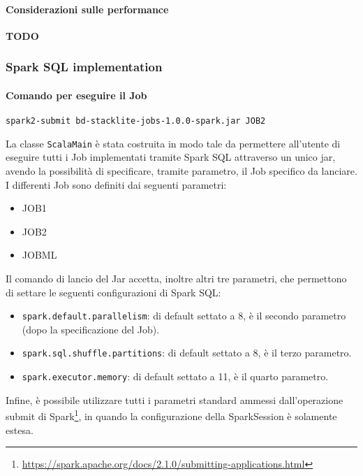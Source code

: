   \paragraph{Considerazioni sulle performance}\label{par:job2:mapreduce:performance}

  \textbf{TODO}

  \subsubsection{Spark SQL implementation}\label{subsub:job2:spark}

  \paragraph{Comando per eseguire il Job}\label{par:job2:spark:cmd}

  \texttt{spark2-submit bd-stacklite-jobs-1.0.0-spark.jar JOB2}

  La classe \texttt{ScalaMain} è stata costruita in modo tale da permettere all'utente di eseguire tutti i Job implementati tramite
  Spark SQL attraverso un unico jar, avendo la possibilità di specificare, tramite parametro, il Job specifico da lanciare.
  I differenti Job sono definiti dai seguenti parametri:
  \begin{itemize}
    \item JOB1
    \item JOB2
    \item JOBML
  \end{itemize}

  Il comando di lancio del Jar accetta, inoltre altri tre parametri, che permettono di settare le seguenti configurazioni di Spark SQL\@:
  \begin{itemize}
    \item \texttt{spark.default.parallelism}: di default settato a 8, è il secondo parametro (dopo la specificazione del Job).
    \item \texttt{spark.sql.shuffle.partitions}: di default settato a 8, è il terzo parametro.
    \item \texttt{spark.executor.memory}: di default settato a 11, è il quarto parametro.
  \end{itemize}

  Infine, è possibile utilizzare tutti i parametri standard ammessi dall'operazione submit di Spark\footnote{\url{https://spark.apache.org/docs/2.1.0/submitting-applications.html}},
  in quando la configurazione della SparkSession è solamente estesa.

